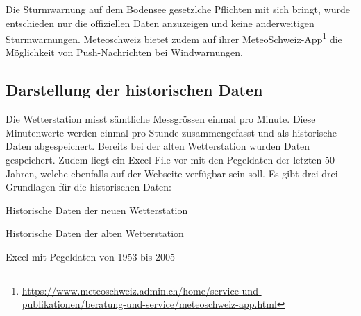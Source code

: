 \noindent
 Die Sturmwarnung auf dem Bodensee gesetzlche Pflichten mit sich bringt, wurde entschieden nur die offiziellen Daten anzuzeigen und keine anderweitigen Sturmwarnungen. Meteoschweiz bietet zudem auf ihrer MeteoSchweiz-App\footnote{ \url{https://www.meteoschweiz.admin.ch/home/service-und-publikationen/beratung-und-service/meteoschweiz-app.html}} die Möglichkeit von Push-Nachrichten bei Windwarnungen.







\subsection{Darstellung der historischen Daten}
Die Wetterstation misst sämtliche Messgrössen einmal pro Minute. Diese Minutenwerte werden einmal pro Stunde zusammengefasst und als historische Daten abgespeichert. Bereits bei der alten Wetterstation wurden Daten gespeichert. Zudem liegt ein Excel-File vor mit den Pegeldaten der letzten 50 Jahren, welche ebenfalls auf der Webseite verfügbar sein soll. Es gibt drei drei Grundlagen für die historischen Daten:

\begin{itemize*}
\item Historische Daten der neuen Wetterstation
\item Historische Daten der alten Wetterstation
\item Excel mit Pegeldaten von 1953 bis 2005
\end{itemize*}

